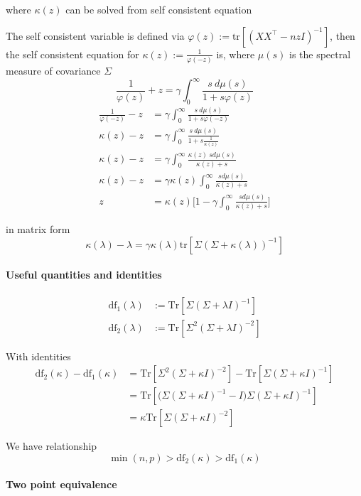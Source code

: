 where $\kappa(z)$ can be solved from self consistent equation

The self consistent variable is defined via $\varphi(z):=\mbox{tr}[(XX^{\top}-nzI)^{-1}]$,
then the self consistent equation for $\kappa(z):=\frac{1}{\varphi(-z)}$
is, where $\mu(s)$ is the spectral measure of covariance $\Sigma$
\[
\frac{1}{\varphi(z)}+z=\gamma\int_{0}^{\infty}\frac{s\ d\mu(s)}{1+s\varphi(z)}
\]
\begin{align*}
\frac{1}{\varphi(-z)}-z & =\gamma\int_{0}^{\infty}\frac{s\ d\mu(s)}{1+s\varphi(-z)}\\
\kappa(z)-z & =\gamma\int_{0}^{\infty}\frac{s\ d\mu(s)}{1+s\frac{1}{\kappa(z)}}\\
\kappa(z)-z & =\gamma\int_{0}^{\infty}\frac{\kappa(z)\ sd\mu(s)}{\kappa(z)+s}\\
\kappa(z)-z & =\gamma\kappa(z)\int_{0}^{\infty}\frac{sd\mu(s)}{\kappa(z)+s}\\
z & =\kappa(z)\Big[1-\gamma\int_{0}^{\infty}\frac{\ sd\mu(s)}{\kappa(z)+s}\Big]
\end{align*}

in matrix form
\[
\kappa(\lambda)-\lambda=\gamma\kappa(\lambda)\!\mathrm{tr}[\Sigma(\Sigma+\kappa(\lambda))^{-1}]
\]


\paragraph{Useful quantities and identities}

\begin{align*}
\mathrm{df}_{1}(\lambda) & :=\mbox{Tr}[\Sigma(\Sigma+\lambda I)^{-1}]\\
\mathrm{df}_{2}(\lambda) & :=\mbox{Tr}[\Sigma^{2}(\Sigma+\lambda I)^{-2}]
\end{align*}

With identities
\begin{align*}
\mathrm{df}_{2}(\kappa)-\mathrm{df}_{1}(\kappa) & =\mbox{Tr}[\Sigma^{2}(\Sigma+\kappa I)^{-2}]-\mbox{Tr}[\Sigma(\Sigma+\kappa I)^{-1}]\\
 & =\mbox{Tr}[\big(\Sigma(\Sigma+\kappa I)^{-1}-I\big)\Sigma(\Sigma+\kappa I)^{-1}]\\
 & =\kappa\mbox{Tr}[\Sigma(\Sigma+\kappa I)^{-2}]
\end{align*}

We have relationship
\[
\min(n,p)>\mathrm{df}_{2}(\kappa)>\mathrm{df}_{1}(\kappa)
\]


\paragraph{Two point equivalence}

